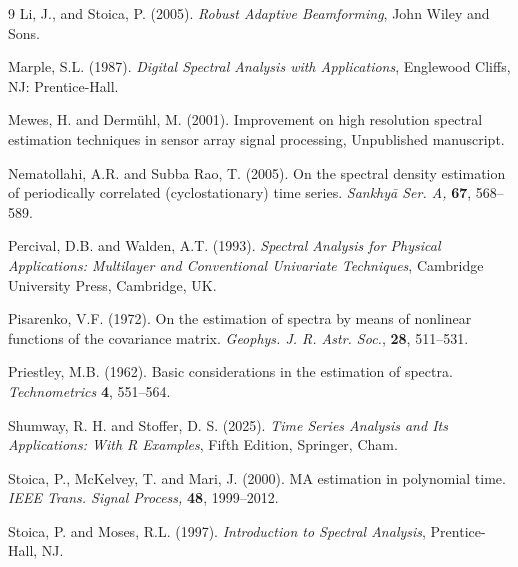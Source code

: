 \documentclass[twoside]{article}
\begin{document}
\begin{thebibliography}{9}
Li, J., and Stoica, P. (2005). \textit{Robust Adaptive Beamforming}, John Wiley and Sons.



Marple, S.L. (1987). \textit{Digital Spectral Analysis with Applications}, Englewood Cliffs, NJ: Prentice-Hall.



Mewes, H. and Dermühl, M. (2001). Improvement on high resolution spectral estimation techniques in sensor array signal processing, Unpublished manuscript.





Nematollahi, A.R. and Subba Rao, T. (2005). On the spectral density estimation of periodically correlated (cyclostationary) time series. \textit{Sankhy\={a} Ser. A,} \textbf{67}, 568--589.



Percival, D.B. and Walden, A.T. (1993). \textit{Spectral Analysis for Physical Applications: Multilayer and Conventional Univariate Techniques}, Cambridge University Press, Cambridge, UK.



Pisarenko, V.F. (1972). On the estimation of spectra by means of nonlinear functions of the covariance matrix. \textit{Geophys. J. R. Astr. Soc.}, \textbf{28}, 511--531.



Priestley, M.B. (1962). Basic considerations in the estimation of spectra. \textit{Technometrics} \textbf{4}, 551--564.



Shumway, R. H. and Stoffer, D. S. (2025). \textit{Time Series Analysis and Its Applications: With R Examples}, Fifth Edition, Springer, Cham.



Stoica, P., McKelvey, T. and Mari, J. (2000). MA estimation in polynomial time. \textit{IEEE Trans. Signal Process,} \textbf{48}, 1999--2012.



Stoica, P. and Moses, R.L. (1997). \textit{Introduction to Spectral Analysis}, Prentice-Hall, NJ.




\end{thebibliography}
\end{document}
